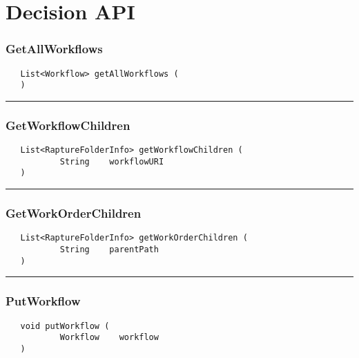 \chapter{Decision API}

\subsection{GetAllWorkflows}
\label{Api:GetAllWorkflows}
\begin{verbatim}
   List<Workflow> getAllWorkflows (
   )
\end{verbatim}



\rule{15cm}{2pt}
\subsection{GetWorkflowChildren}
\label{Api:GetWorkflowChildren}
\begin{verbatim}
   List<RaptureFolderInfo> getWorkflowChildren (
           String    workflowURI
   )
\end{verbatim}



\rule{15cm}{2pt}
\subsection{GetWorkOrderChildren}
\label{Api:GetWorkOrderChildren}
\begin{verbatim}
   List<RaptureFolderInfo> getWorkOrderChildren (
           String    parentPath
   )
\end{verbatim}



\rule{15cm}{2pt}
\subsection{PutWorkflow}
\label{Api:PutWorkflow}
\begin{verbatim}
   void putWorkflow (
           Workflow    workflow
   )
\end{verbatim}



